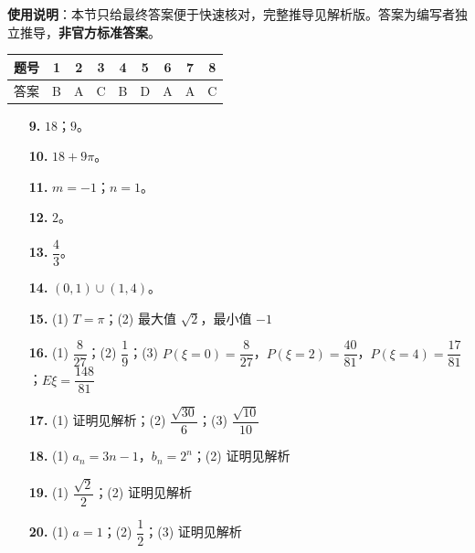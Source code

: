 
\begin{gknotice}
\textbf{使用说明}：本节只给最终答案便于快速核对，完整推导见解析版。答案为编写者独立推导，\textbf{非官方标准答案}。
\end{gknotice}

\begin{center}\begin{tabular}{ccccccccc}
\toprule
题号 & 1 & 2 & 3 & 4 & 5 & 6 & 7 & 8 \\
\midrule
答案 & B & A & C & B & D & A & A & C \\
\bottomrule
\end{tabular}\end{center}

\begin{itemize}[leftmargin=2.6em]
  \item[\textbf{9.}] $18$；$9$。
  \item[\textbf{10.}] $18+9\pi$。
  \item[\textbf{11.}] $m=-1$；$n=1$。
  \item[\textbf{12.}] $2$。
  \item[\textbf{13.}] $\dfrac43$。
  \item[\textbf{14.}] $(0,1)\cup(1,4)$。
\end{itemize}

\begin{itemize}[leftmargin=2.6em]
  \item[\textbf{15.}] (1) $T=\pi$；(2) 最大值 $\sqrt2$，最小值 $-1$
  \item[\textbf{16.}] (1) $\dfrac8{27}$；(2) $\dfrac19$；(3) $P(\xi=0)=\dfrac8{27}$，$P(\xi=2)=\dfrac{40}{81}$，$P(\xi=4)=\dfrac{17}{81}$；$E\xi=\dfrac{148}{81}$
  \item[\textbf{17.}] (1) 证明见解析；(2) $\dfrac{\sqrt{30}}6$；(3) $\dfrac{\sqrt{10}}{10}$
  \item[\textbf{18.}] (1) $a_n=3n-1$，$b_n=2^n$；(2) 证明见解析
  \item[\textbf{19.}] (1) $\dfrac{\sqrt2}2$；(2) 证明见解析
  \item[\textbf{20.}] (1) $a=1$；(2) $\dfrac12$；(3) 证明见解析
\end{itemize}
